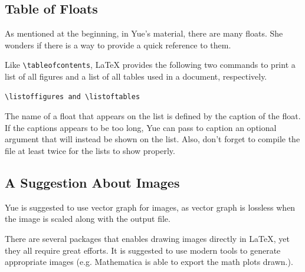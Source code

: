 \subsection{Table of Floats}
As mentioned at the beginning, in Yue's material, there are many floats. She wonders if there is a way to provide a quick reference to them.

Like \verb=\tableofcontents=, \LaTeX{} provides the following two commands to print a list of all figures and a list of all tables used in a document, respectively.
\begin{verbatim}
\listoffigures and \listoftables
\end{verbatim}
The name of a float that appears on the list is defined by the caption of the float. If the captions appears to be too long, Yue can pass to caption an optional argument that will instead be shown on the list. Also, don't forget to compile the file at least twice for the lists to show properly.

\subsection{A Suggestion About Images}
Yue is suggested to use vector graph for images, as vector graph is lossless when the image is scaled along with the output file.

There are several packages that enables drawing images directly in \LaTeX{}, yet they all require great efforts. It is suggested to use modern tools to generate appropriate images (e.g. Mathematica is able to export the math plots drawn.).